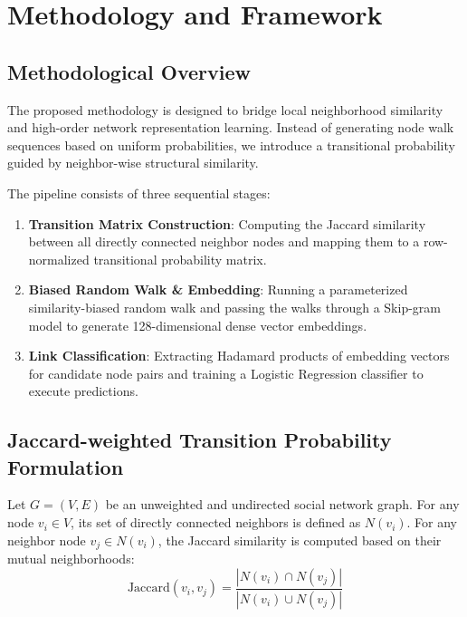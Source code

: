 \chapter{Methodology and Framework}

\ifpdf
    \graphicspath{{Chapter3/Figs/Raster/}{Chapter3/Figs/PDF/}{Chapter3/Figs/}}
\else
    \graphicspath{{Chapter3/Figs/Vector/}{Chapter3/Figs/}}
\fi

\section{Methodological Overview}

The proposed methodology is designed to bridge local neighborhood similarity and high-order network representation learning. Instead of generating node walk sequences based on uniform probabilities, we introduce a transitional probability guided by neighbor-wise structural similarity. 

The pipeline consists of three sequential stages:
\begin{enumerate}
    \item \textbf{Transition Matrix Construction}: Computing the Jaccard similarity between all directly connected neighbor nodes and mapping them to a row-normalized transitional probability matrix.
    \item \textbf{Biased Random Walk & Embedding}: Running a parameterized similarity-biased random walk and passing the walks through a Skip-gram model to generate 128-dimensional dense vector embeddings.
    \item \textbf{Link Classification}: Extracting Hadamard products of embedding vectors for candidate node pairs and training a Logistic Regression classifier to execute predictions.
\end{enumerate}

\section{Jaccard-weighted Transition Probability Formulation}

Let $G = (V, E)$ be an unweighted and undirected social network graph. For any node $v_i \in V$, its set of directly connected neighbors is defined as $N(v_i)$. For any neighbor node $v_j \in N(v_i)$, the Jaccard similarity is computed based on their mutual neighborhoods:
\begin{equation}
    \text{Jaccard}(v_i, v_j) = \frac{|N(v_i) \cap N(v_j)|}{|N(v_i) \cup N(v_j)|}
\end{equation}

